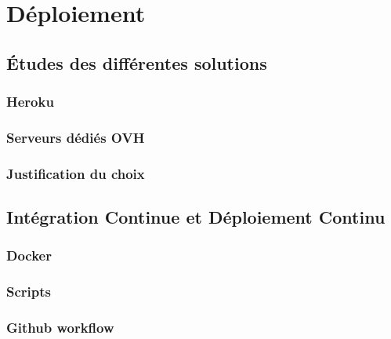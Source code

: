 \section{Déploiement}
\subsection{Études des différentes solutions}
\subsubsection{Heroku}
\subsubsection{Serveurs dédiés OVH}
\subsubsection{Justification du choix}
\subsection{Intégration Continue et Déploiement Continu}
\subsubsection{Docker}
\subsubsection{Scripts}
\subsubsection{Github workflow}
